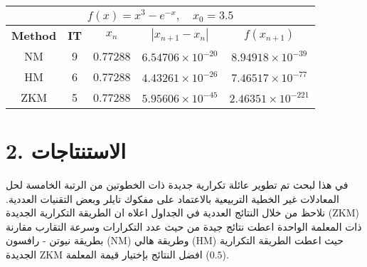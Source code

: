 \vspace{1cm}
\begin{table}[H]
	\caption{}
		\renewcommand{\arraystretch}{2}
	\centering
	\begin{english}
		\begin{tabular}{|c|c|c|c|c|}
			\hline
			\multicolumn{5}{|c|}{$f(x) = x^3 - e^{-x}, \quad x_0 = 3.5$}\\
			\hline
			\textbf{Method} & \textbf{IT} & $x_n$ & $|x_{n+1}-x_n|$& $f(x_{n+1})$ \\
			\hline
			NM & 9 & 0.77288 & $6.54706\times 10^{-20}$ & $8.94918\times 10^{-39}$\\
			HM & 6 & 0.77288 & $4.43261\times 10^{-26}$ & $7.46517\times 10^{-77}$\\
			ZKM & 5 & 0.77288 & $5.95606\times10^{-45}$ & $2.46351 \times10^{-221}$\\
			\hline
		\end{tabular}
	\end{english}
\end{table}

\section*{2. الاستنتاجات}
في هذا لبحث تم تطوير عائلة تكرارية جديدة ذات الخطوتين من الرتبة الخامسة لحل المعادلات غير الخطية التربيعية بالاعتماد على مفكوك تايلر وبعض التقنيات العددية. نلاحظ من خلال النتائج العددية في الجداول اعلاه ان الطريقة التكرارية الجديدة (ZKM) ذات المعلمة الواحدة اعطت نتائج جيدة من حيث عدد التكرارات وسرعة التقارب مقارنة بطريقة نيوتن - رافسون (NM) وطريقة هالي (HM) حيث اعطت الطريقة التكرارية الجديدة ZKM افضل النتائج بإختيار قيمة المعلمة ($0.5$).


